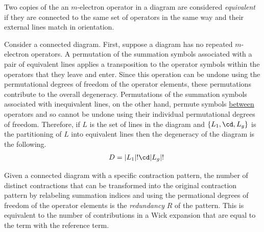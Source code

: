 \documentclass[11pt,fleqn]{article}
\numberwithin{equation}{section}
\begin{document}
\begin{dfn}
Two copies of the an $m$-electron operator in a diagram are considered \textit{equivalent} if they are connected to the same set of operators in the same way and their external lines match in orientation. 
\end{dfn}

\begin{drv}
Consider a connected diagram.
First, suppose a diagram has no repeated $m$-electron operators.
A permutation of the summation symbols associated with a pair of equivalent lines applies a transposition to the operator symbols within the operators that they leave and enter.
Since this operation can be undone using the permutational degrees of freedom of the operator elements, these permutations contribute to the overall degeneracy.
Permutations of the summation symbols associated with inequivalent lines, on the other hand, permute symbols \ul{between} operators and so cannot be undone using their individual permutational degrees of freedom.
Therefore, if $L$ is the set of lines in the diagram and $\{L_1,\cd, L_g\}$ is the partitioning of $L$ into equivalent lines then the degeneracy of the diagram is the following.
\begin{align}
&&
  D
=
  |L_1|!\cd|L_g|!
\end{align}
\end{drv}

\begin{dfn}
Given a connected diagram with a specific contraction pattern, the number of distinct contractions that can be transformed into the original contraction pattern by relabeling summation indices and using the permational degrees of freedom of the operator elements is the \textit{redundancy} $R$ of the pattern.
This is equivalent to the number of contributions in a Wick expansion that are equal to the term with the reference term.
\end{dfn}
\end{document}
